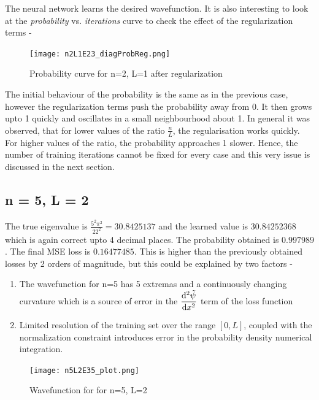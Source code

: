 \documentclass{article}
\newcommand{\psitilde}{\tilde{\psi}}
\newcommand{\iterations}{\textit{iterations} }
\newcommand{\probability}{\textit{probability} }
\begin{document}
\justify
The neural network learns the desired wavefunction. It is also interesting to look at the  \probability vs. \iterations curve to check the effect of the regularization terms - 

\begin{figure}[!htb]
    \centering
    \texttt{[image: n2L1E23\_diagProbReg.png]}
    \label{fig:n2L3_plotReg}
    \caption{Probability curve for n=2, L=1 after regularization}
\end{figure}

\justify
The initial behaviour of the probability is the same as in the previous case, however the regularization terms push the probability away from 0. It then grows upto 1 quickly and oscillates in a small neighbourhood about 1. In general it was observed, that for lower values of the ratio $\displaystyle{\frac{n}{L}}$, the regularisation works quickly. For higher values of the ratio, the probability approaches 1 slower. Hence, the number of training iterations cannot be fixed for every case and this very issue is discussed in the next section.

\subsection{n = 5, L = 2}

\justify
The true eigenvalue is $\displaystyle{\frac{5^2 \pi^2}{2 2^2}} = 30.8425137$ and the learned value is $30.84252368$ which is again correct upto 4 decimal places. The probability obtained is $0.997989$. The final MSE loss is $0.16477485$. This is higher than the previously obtained losses by 2 orders of magnitude, but this could be explained by two factors - 
\begin{enumerate}
    \item The wavefunction for n=5 has 5 extremas and a continuously changing curvature which is a source of error in the $\displaystyle{\dv[2]{\psitilde}{x}}$ term of the loss function
    \item Limited resolution of the training set over the range $\left[0,L\right]$, coupled with the normalization constraint introduces error in the probability density numerical integration.
\end{enumerate}

\begin{figure}[!htb]
    \centering
    \texttt{[image: n5L2E35\_plot.png]}
    \label{fig:n5L2_plot}
    \caption{Wavefunction for for n=5, L=2}
\end{figure}
\end{document}
